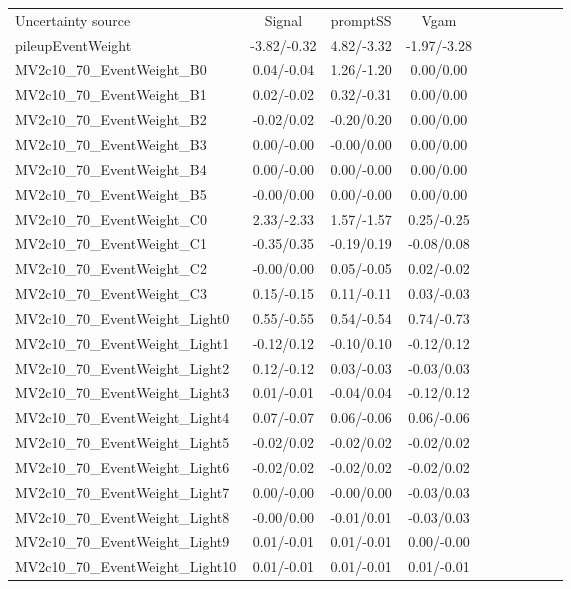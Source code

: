 \begin{table}[h]
\scriptsize
\begin{center}
\begin{tabular}{l|ccccccccc}
\hline
\hline
Uncertainty source &Signal &promptSS &Vgam \\
pileupEventWeight &-3.82/-0.32 &4.82/-3.32 &-1.97/-3.28 \\
MV2c10\_70\_EventWeight\_B0 &0.04/-0.04 &1.26/-1.20 &0.00/0.00 \\
MV2c10\_70\_EventWeight\_B1 &0.02/-0.02 &0.32/-0.31 &0.00/0.00 \\
MV2c10\_70\_EventWeight\_B2 &-0.02/0.02 &-0.20/0.20 &0.00/0.00 \\
MV2c10\_70\_EventWeight\_B3 &0.00/-0.00 &-0.00/0.00 &0.00/0.00 \\
MV2c10\_70\_EventWeight\_B4 &0.00/-0.00 &0.00/-0.00 &0.00/0.00 \\
MV2c10\_70\_EventWeight\_B5 &-0.00/0.00 &0.00/-0.00 &0.00/0.00 \\
MV2c10\_70\_EventWeight\_C0 &2.33/-2.33 &1.57/-1.57 &0.25/-0.25 \\
MV2c10\_70\_EventWeight\_C1 &-0.35/0.35 &-0.19/0.19 &-0.08/0.08 \\
MV2c10\_70\_EventWeight\_C2 &-0.00/0.00 &0.05/-0.05 &0.02/-0.02 \\
MV2c10\_70\_EventWeight\_C3 &0.15/-0.15 &0.11/-0.11 &0.03/-0.03 \\
MV2c10\_70\_EventWeight\_Light0 &0.55/-0.55 &0.54/-0.54 &0.74/-0.73 \\
MV2c10\_70\_EventWeight\_Light1 &-0.12/0.12 &-0.10/0.10 &-0.12/0.12 \\
MV2c10\_70\_EventWeight\_Light2 &0.12/-0.12 &0.03/-0.03 &-0.03/0.03 \\
MV2c10\_70\_EventWeight\_Light3 &0.01/-0.01 &-0.04/0.04 &-0.12/0.12 \\
MV2c10\_70\_EventWeight\_Light4 &0.07/-0.07 &0.06/-0.06 &0.06/-0.06 \\
MV2c10\_70\_EventWeight\_Light5 &-0.02/0.02 &-0.02/0.02 &-0.02/0.02 \\
MV2c10\_70\_EventWeight\_Light6 &-0.02/0.02 &-0.02/0.02 &-0.02/0.02 \\
MV2c10\_70\_EventWeight\_Light7 &0.00/-0.00 &-0.00/0.00 &-0.03/0.03 \\
MV2c10\_70\_EventWeight\_Light8 &-0.00/0.00 &-0.01/0.01 &-0.03/0.03 \\
MV2c10\_70\_EventWeight\_Light9 &0.01/-0.01 &0.01/-0.01 &0.00/-0.00 \\
MV2c10\_70\_EventWeight\_Light10 &0.01/-0.01 &0.01/-0.01 &0.01/-0.01 \\

\end{tabular}
\end{center}
\end{table}
